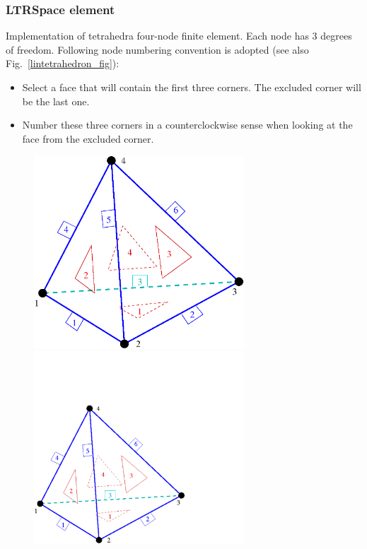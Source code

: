 \documentclass[a4paper]{article}
\begin{document}
\subsubsection{LTRSpace element}
Implementation of tetrahedra four-node finite element. 
Each node has 3 degrees of freedom.
Following node numbering convention is adopted (see also Fig.~\ref{lintetrahedron_fig}):
\begin{itemize}
\item Select a face that will contain the first three corners. The excluded corner will be the last one.
\item Number these three corners in a counterclockwise sense when looking at the face from the
      excluded corner.
\end{itemize}
 
\begin{figure}[tb]
\begin{htmlonly}
  \centerline{\includegraphics[width=0.7\textwidth]{tetrahedra_lin.eps}}
\end{htmlonly}
\ifpdf
 \centerline{\includegraphics[width=0.7\textwidth]{tetrahedra_lin.pdf}}

\end{figure}
\end{document}
